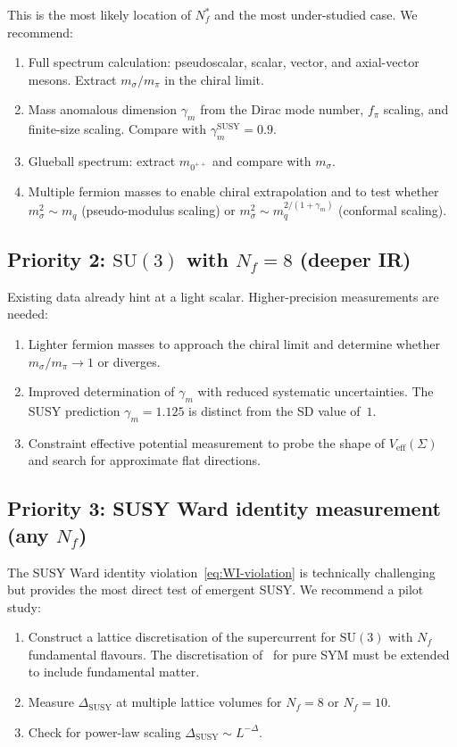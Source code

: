 \documentclass[11pt,a4paper]{article}
\theoremstyle{plain}
\theoremstyle{definition}
\theoremstyle{remark}
\newcommand{\Nf}{N_{\!f}}
\newcommand{\Nfstar}{\Nf^*}
\newcommand{\SU}[1]{\mathrm{SU}(#1)}
\begin{document}
This is the most likely location of $\Nfstar$ and the most
under-studied case.  We recommend:
\begin{enumerate}[label=(\alph*)]
  \item Full spectrum calculation: pseudoscalar, scalar, vector,
    and axial-vector mesons.  Extract $m_\sigma / m_\pi$ in the chiral
    limit.
  \item Mass anomalous dimension $\gamma_m$ from the Dirac mode number,
    $f_\pi$ scaling, and finite-size scaling.  Compare with
    $\gamma_m^{\mathrm{SUSY}} = 0.9$.
  \item Glueball spectrum: extract $m_{0^{++}}$ and compare with
    $m_\sigma$.
  \item Multiple fermion masses to enable chiral extrapolation and
    to test whether $m_\sigma^2 \sim m_q$ (pseudo-modulus scaling) or
    $m_\sigma^2 \sim m_q^{2/(1+\gamma_m)}$ (conformal scaling).
\end{enumerate}

\subsection{Priority 2: $\SU{3}$ with $\Nf = 8$ (deeper IR)}

Existing data already hint at a light scalar.  Higher-precision
measurements are needed:
\begin{enumerate}[label=(\alph*)]
  \item Lighter fermion masses to approach the chiral limit and
    determine whether $m_\sigma / m_\pi \to 1$ or diverges.
  \item Improved determination of $\gamma_m$ with reduced systematic
    uncertainties.  The SUSY prediction $\gamma_m = 1.125$ is distinct
    from the SD value of~$1$.
  \item Constraint effective potential measurement to probe the shape
    of $V_{\mathrm{eff}}(\Sigma)$ and search for approximate flat
    directions.
\end{enumerate}

\subsection{Priority 3: SUSY Ward identity measurement (any $\Nf$)}

The SUSY Ward identity violation~\eqref{eq:WI-violation} is
technically challenging but provides the most direct test of emergent
SUSY.  We recommend a pilot study:
\begin{enumerate}[label=(\alph*)]
  \item Construct a lattice discretisation of the supercurrent for
    $\SU{3}$ with $\Nf$ fundamental flavours.  The discretisation
    of~\cite{DESY2008,Munster2014} for pure SYM must be extended to
    include fundamental matter.
  \item Measure $\Delta_{\mathrm{SUSY}}$ at multiple lattice volumes
    for $\Nf = 8$ or $\Nf = 10$.
  \item Check for power-law scaling $\Delta_{\mathrm{SUSY}} \sim
    L^{-\Delta}$.
\end{enumerate}
\end{document}

